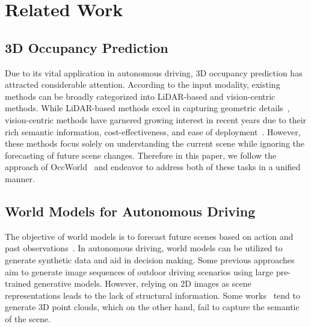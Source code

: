 \section{Related Work}
\label{related_work}

\subsection{3D Occupancy Prediction}

Due to its vital application in autonomous driving, 3D occupancy prediction has attracted considerable attention. According to the input modality, existing methods can be broadly categorized into LiDAR-based and vision-centric methods. While LiDAR-based methods excel in capturing geometric details~\citep{tang2020searching, ye2021drinet++, ye2023lidarmultinet}, vision-centric methods have garnered growing interest in recent years due to their rich semantic information, cost-effectiveness, and ease of deployment~\citep{philion2020lift, liu2023fully, ma2024cotr}. However, these methods focus solely on understanding the current scene while ignoring the forecasting of future scene changes. Therefore in this paper, we follow the approach of OccWorld~\citep{zheng2023occworld} and endeavor to address both of these tasks in a unified manner.

\subsection{World Models for Autonomous Driving}

The objective of world models is to forecast future scenes based on action and past observations~\citep{ha2018world}. In autonomous driving, world models can be utilized to generate synthetic data and aid in decision making. Some previous approaches~\citep{hu2023gaia, gao2023magicdrive, wang2024driving} aim to generate image sequences of outdoor driving scenarios using large pre-trained generative models. However, relying on 2D images as scene representations leads to the lack of structural information. Some works~\citep{khurana2022differentiable, khurana2023point, zhang2023learning} tend to generate 3D point clouds, which on the other hand, fail to capture the semantic of the scene.

